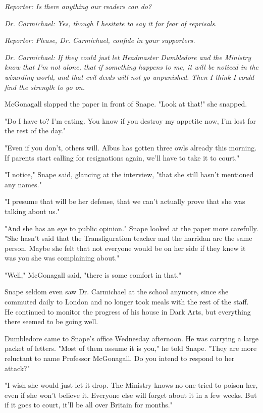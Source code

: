 \emph{Reporter: Is there anything our readers can do?}

\emph{Dr. Carmichael: Yes, though I hesitate to say it for fear of reprisals.}

\emph{Reporter: Please, Dr. Carmichael, confide in your supporters.}

\emph{Dr. Carmichael: If they could just let Headmaster Dumbledore and the Ministry know that I'm not alone, that if something happens to me, it will be noticed in the wizarding world, and that evil deeds will not go unpunished. Then I think I could find the strength to go on.}

McGonagall slapped the paper in front of Snape. "Look at that!" she snapped.

"Do I have to? I'm eating. You know if you destroy my appetite now, I'm lost for the rest of the day."

"Even if you don't, others will. Albus has gotten three owls already this morning. If parents start calling for resignations again, we'll have to take it to court."

"I notice," Snape said, glancing at the interview, "that she still hasn't mentioned any names."

"I presume that will be her defense, that we can't actually prove that she was talking about us."

"And she has an eye to public opinion." Snape looked at the paper more carefully. "She hasn't said that the Transfiguration teacher and the harridan are the same person. Maybe she felt that not everyone would be on her side if they knew it was you she was complaining about."

"Well," McGonagall said, "there is some comfort in that."

Snape seldom even saw Dr. Carmichael at the school anymore, since she commuted daily to London and no longer took meals with the rest of the staff. He continued to monitor the progress of his house in Dark Arts, but everything there seemed to be going well.

Dumbledore came to Snape's office Wednesday afternoon. He was carrying a large packet of letters. "Most of them assume it is you," he told Snape. "They are more reluctant to name Professor McGonagall. Do you intend to respond to her attack?"

"I wish she would just let it drop. The Ministry knows no one tried to poison her, even if she won't believe it. Everyone else will forget about it in a few weeks. But if it goes to court, it'll be all over Britain for months."

